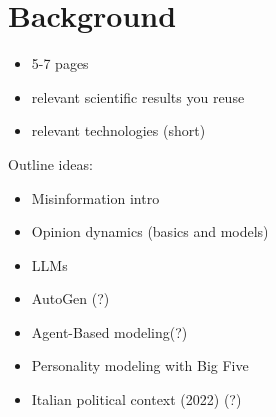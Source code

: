\section{Background}
\label{sec:background}

\begin{itemize} 
    \item 5-7 pages
    \item relevant scientific results you reuse 
    \item relevant technologies (short)
\end{itemize}


\bigskip
Outline ideas:
\begin{itemize}
    \item Misinformation intro
    \item Opinion dynamics (basics and models)
    \item LLMs
    \item AutoGen (?)
    \item Agent-Based modeling(?)
    \item Personality modeling with Big Five
    \item Italian political context (2022) (?)
\end{itemize}